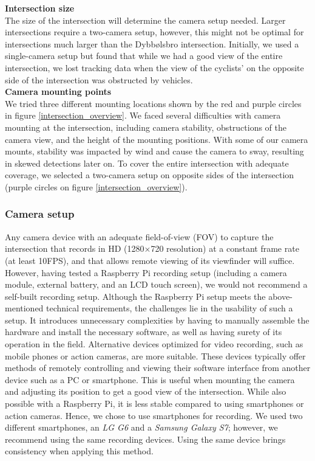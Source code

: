 \textbf{Intersection size} \\
The size of the intersection will determine the camera setup needed. Larger intersections require a two-camera setup, 
however, this might not be optimal for intersections much larger than the Dybbølsbro intersection. 
Initially, we used a single-camera setup but found that while we had a good view of the entire intersection, 
we lost tracking data when the view of the cyclists' on the opposite side of the intersection was obstructed by vehicles.
\ \\

\textbf{Camera mounting points} \\
We tried three different mounting locations shown by the red and purple circles in figure \ref{intersection_overview}. 
We faced several difficulties with camera mounting at the intersection, including camera stability, 
obstructions of the camera view, and the height of the mounting positions. 
With some of our camera mounts, stability was impacted by wind and cause the camera to sway, resulting in skewed detections later on.
To cover the entire intersection with adequate coverage, we selected a two-camera setup on opposite sides of the intersection 
(purple circles on figure \ref{intersection_overview}).

\subsubsection{Camera setup}
Any camera device with an adequate field-of-view (FOV) to capture the intersection that records in HD (1280×720 resolution) at a constant 
frame rate (at least 10FPS), and that allows remote viewing of its viewfinder will suffice. 
However, having tested a Raspberry Pi recording setup (including a camera module, external battery, and an LCD touch screen), 
we would not recommend a self-built recording setup. Although the Raspberry Pi setup meets the above-mentioned technical requirements, 
the challenges lie in the usability of such a setup. 
It introduces unnecessary complexities by having to manually assemble the hardware and install the necessary software, as well as 
having surety of its operation in the field.
Alternative devices optimized for video recording, such as mobile phones or action cameras, are more suitable.
These devices typically offer methods of remotely controlling and viewing their software interface from 
another device such as a PC or smartphone. 
This is useful when mounting the camera and adjusting its position to get a good view of the intersection. 
While also possible with a Raspberry Pi, it is less stable compared to using smartphones or action cameras.
Hence, we chose to use smartphones for recording. We used two different smartphones, an \textit{LG G6} and a \textit{Samsung Galaxy S7}; however, we recommend using the same recording devices. Using the same device brings consistency when applying this method.

